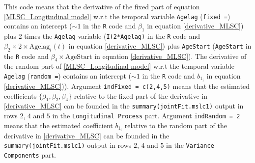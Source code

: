 \documentclass[12pt]{article}
\begin{document}
This code means that the derivative of the fixed part of equation \eqref{MLSC_Longitudinal model} w.r.t the temporal variable \texttt{Agelag} (\texttt{fixed =}) contains an intercept (\texttt{$\sim 1$} in the \texttt{R} code and $\beta_1$ in equation \eqref{derivative_MLSC}) plus $2$ times the \texttt{Agelag} variable (\texttt{I(2*Agelag)} in the \texttt{R} code and $\beta_2 \times 2 \times \text{Agelag}_i(t)$ in equation \eqref{derivative_MLSC}) plus \texttt{AgeStart} (\texttt{AgeStart} in the \texttt{R} code and $\beta_4 \times \text{AgeStart}$ in equation \eqref{derivative_MLSC}). The derivative of the random part of \eqref{MLSC_Longitudinal model} w.r.t the temporal variable \texttt{Agelag} (\texttt{random =}) contains an intercept (\texttt{$\sim 1$} in the \texttt{R} code and $b_{1_{i}}$ in equation \ref{derivative_MLSC})). Argument \texttt{indFixed = c(2,4,5)} means that the estimated coefficients $\{\beta_1,\beta_2, \beta_4\}$ relative to the fixed part of the derivative in \eqref{derivative_MLSC} can be founded in the \texttt{summary(jointFit.mslc1)} output in rows $2$, $4$ and $5$ in the \texttt{Longitudinal Process} part. Argument \texttt{indRandom = 2} means that the estimated coefficient $b_{1_{i}}$ relative to the random part of the derivative in \eqref{derivative_MLSC} can be founded in the \texttt{summary(jointFit.mslc1)} output in rows $2$, $4$ and $5$ in the \texttt{Variance Components} part.
\end{document}
